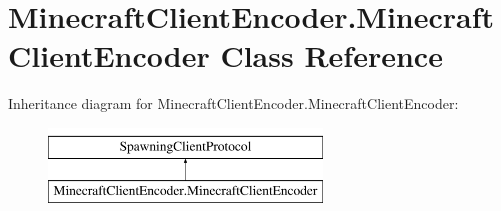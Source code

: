 \hypertarget{classMinecraftClientEncoder_1_1MinecraftClientEncoder}{\section{Minecraft\-Client\-Encoder.\-Minecraft\-Client\-Encoder Class Reference}
\label{classMinecraftClientEncoder_1_1MinecraftClientEncoder}
}
Inheritance diagram for Minecraft\-Client\-Encoder.\-Minecraft\-Client\-Encoder\-:\begin{figure}[H]
\begin{center}
\leavevmode
\includegraphics[height=2.000000cm]{classMinecraftClientEncoder_1_1MinecraftClientEncoder}
\end{center}
\end{figure}
